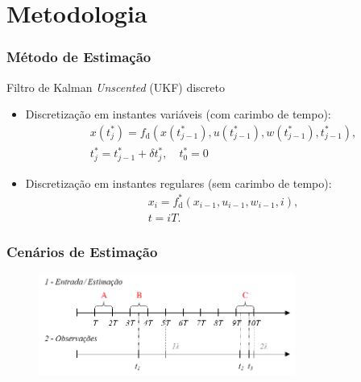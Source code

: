 \documentclass{beamer}
\renewcommand{\(}{\left(}
\renewcommand{\)}{\right)}
\renewcommand{\[}{\left[}
\renewcommand{\]}{\right]}
\begin{document}

\section{Metodologia} 



\begin{frame}
	\frametitle{Método de Estimação}
	
	Filtro de Kalman \textit{Unscented} (UKF) discreto \cite{Julier2004}
	
	\vspace{0.25cm}
	\begin{itemize}
		\item Discretização em instantes variáveis (com carimbo de tempo):	
		\begin{align*}
		&x(t^*_j)=f_{\textrm{d}}(x(t^*_{j-1}),u(t^*_{j-1}),w(t^*_{j-1}),t^*_{j-1}),\\
		&t^*_j= t^*_{j-1} + \delta t^*_j, \quad  t^*_0=0
		\end{align*}
		
		\vspace{0.25cm}
		\item Discretização em instantes regulares (sem carimbo de tempo):
		\begin{align*}
		&x_i=f^*_{\textrm{d}}(x_{i-1},u_{i-1},w_{i-1},i),\\
		&t=iT.
		\end{align*}
		
	\end{itemize}


\end{frame}


\begin{frame}
	\frametitle{Cenários de Estimação}
	
	\begin{figure}
		\centering
		\includegraphics[width=0.75\textwidth]{images/cenarios-est.png}
	\end{figure}
	

\end{frame}
\end{document}
